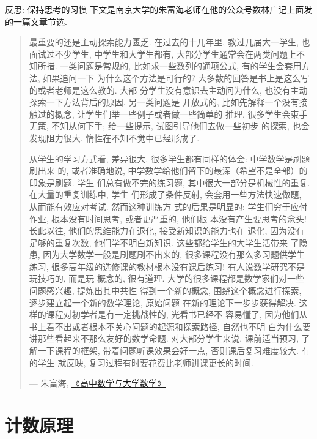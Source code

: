 \begin{exercise}{反思: 保持思考的习惯}
  下文是南京大学的朱富海老师在他的公众号数林广记上面发的一篇文章节选. 
  \begin{quote}
    最重要的还是主动探索能力匮乏. 在过去的十几年里, 教过几届大一学生, 
    也面试过不少学生, 中学生和大学生都有, 大部分学生通常会在两类问题上不知所措. 
    一类问题是常规的, 比如求一些数列的通项公式, 有的学生会套用方法, 如果追问一下
    为什么这个方法是可行的? 大多数的回答是书上是这么写的或者老师是这么教的. 大部
    分学生没有意识去主动问为什么, 也没有主动探索一下方法背后的原因. 另一类问题是
    开放式的, 比如先解释一个没有接触过的概念, 让学生们举一些例子或者做一些简单的
    推理, 很多学生会束手无策, 不知从何下手; 给一些提示, 试图引导他们去做一些初步
    的探索, 也会发现阻力很大. 惰性在不知不觉中已经形成了.

    从学生的学习方式看, 差异很大. 很多学生都有同样的体会: 中学数学是刷题刷出来
    的, 或者准确地说, 中学数学给他们留下的最深（希望不是全部）的印象是刷题. 学生
    们总有做不完的练习题, 其中很大一部分是机械性的重复. 在大量的重复训练中, 学生
    们形成了条件反射, 会套用一些方法快速做题, 从而能有效应对考试. 然而这种训练方
    式的后果是明显的: 学生们穷于应付作业, 根本没有时间思考, 或者更严重的, 他们根
    本没有产生要思考的念头! 长此以往, 他们的思维能力在退化, 接受新知识的能力也在
    退化, 因为没有足够的重复次数, 他们学不明白新知识. 这些都给学生的大学生活带来
    了隐患, 因为大学数学一般是刷题刷不出来的, 很多课程没有那么多习题供学生练习, 
    很多高年级的选修课的教材根本没有课后练习! 有人说数学研究不是玩技巧的, 而是玩
    概念的, 很有道理. 大学的很多课程都是数学家们对一些问题感兴趣, 提炼出其中共性
    得到一个新的概念, 围绕这个概念进行探索, 逐步建立起一个新的数学理论, 原始问题
    在新的理论下一步步获得解决. 这样的课程对初学者是有一定挑战性的, 光看书已经不
    容易懂了, 因为他们从书上看不出或者根本不关心问题的起源和探索路径, 自然也不明
    白为什么要讲那些看起来不那么友好的数学命题. 对大部分学生来说, 课前适当预习, 
    了解一下课程的框架, 带着问题听课效果会好一点, 否则课后复习难度较大. 有的学生
    就反映, 复习过程有时要花费比老师讲课更长的时间.

    \hfill --- 朱富海, \href{https://mp.weixin.qq.com/s/9x1WZSi-thcBSsfIK8HuGg}{《高中数学与大学数学》 }
  \end{quote}
\end{exercise}

\section{计数原理}

